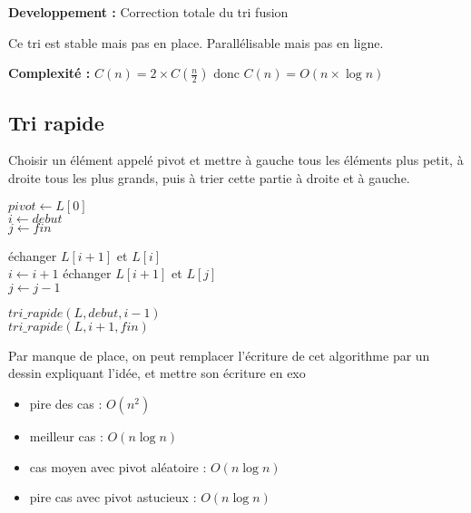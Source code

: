 \textbf{Developpement :} Correction totale du tri fusion

\begin{proposition}
	Ce tri est stable mais pas en place. Parallélisable mais pas en ligne.
\end{proposition}

\textbf{Complexité :} $C(n) = 2\times C(\frac{n}{2})$ donc $C(n) = O(n \times \log n)$

\subsection{Tri rapide}

\begin{idee}
	Choisir un élément appelé pivot et mettre à gauche tous les éléments plus petit, à droite tous les plus grands, puis à trier cette partie à droite et à gauche.
\end{idee}

\begin{algorithm}
	\caption{$tri\_rapide(L, debut, fin)$}
		{}	
	$pivot \gets L[0]$\\	
	$i \gets debut$\\
	$j \gets fin$\\
	{
		{
			échanger $L[i+1]$ et $L[i]$\\
			$i \gets i+1$
		}{		
			échanger $L[i+1]$ et $L[j]$\\
			$j \gets j - 1$
		}
	
		$tri\_rapide(L, debut, i-1)$\\	
		$tri\_rapide(L, i+1, fin)$\\
	}
\end{algorithm}

\begin{com}
	Par manque de place, on peut remplacer l'écriture de cet algorithme par un dessin expliquant l'idée, et mettre son écriture en exo
\end{com}

\begin{proposition}[Complexité]
	\begin{itemize}
		\item pire des cas : $O(n^2)$
		\item meilleur cas : $O(n\log n)$
		\item cas moyen avec pivot aléatoire : $O(n\log n)$
		\item pire cas avec pivot astucieux : $O(n\log n)$
	\end{itemize}
\end{proposition}

